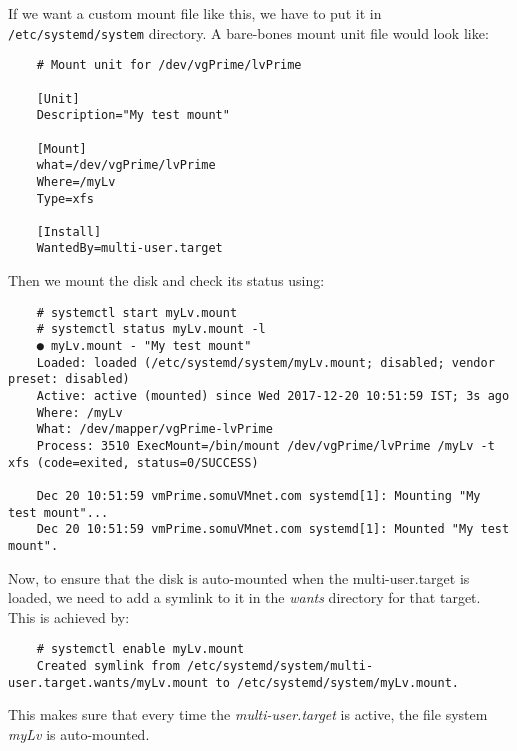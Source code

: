 	If we want a custom mount file like this, we have to put it in \verb|/etc/systemd/system| directory. A bare-bones mount unit file would look like:
	
	\vspace{-15pt}
	\begin{verbatim}
	# Mount unit for /dev/vgPrime/lvPrime
	
	[Unit]
	Description="My test mount"
	
	[Mount]
	what=/dev/vgPrime/lvPrime
	Where=/myLv
	Type=xfs
	
	[Install]
	WantedBy=multi-user.target
	\end{verbatim}
	\vspace{-10pt}
	
	\noindent
	Then we mount the disk and check its status using:
	
	\vspace{-15pt}
	\begin{verbatim}
	# systemctl start myLv.mount
	# systemctl status myLv.mount -l
	● myLv.mount - "My test mount"
	Loaded: loaded (/etc/systemd/system/myLv.mount; disabled; vendor preset: disabled)
	Active: active (mounted) since Wed 2017-12-20 10:51:59 IST; 3s ago
	Where: /myLv
	What: /dev/mapper/vgPrime-lvPrime
	Process: 3510 ExecMount=/bin/mount /dev/vgPrime/lvPrime /myLv -t xfs (code=exited, status=0/SUCCESS)
	
	Dec 20 10:51:59 vmPrime.somuVMnet.com systemd[1]: Mounting "My test mount"...
	Dec 20 10:51:59 vmPrime.somuVMnet.com systemd[1]: Mounted "My test mount".
	\end{verbatim}
	\vspace{-10pt}
	
	\noindent
	Now, to ensure that the disk is auto-mounted when the multi-user.target is loaded, we need to add a symlink to it in the \textit{wants} directory for that target. This is achieved by:
	
	\vspace{-15pt}
	\begin{verbatim}
	# systemctl enable myLv.mount 
	Created symlink from /etc/systemd/system/multi-user.target.wants/myLv.mount to /etc/systemd/system/myLv.mount.
	\end{verbatim}
	\vspace{-10pt}
	
	\noindent
	This makes sure that every time the \textit{multi-user.target} is active, the file system \textit{myLv} is auto-mounted. 
		 



